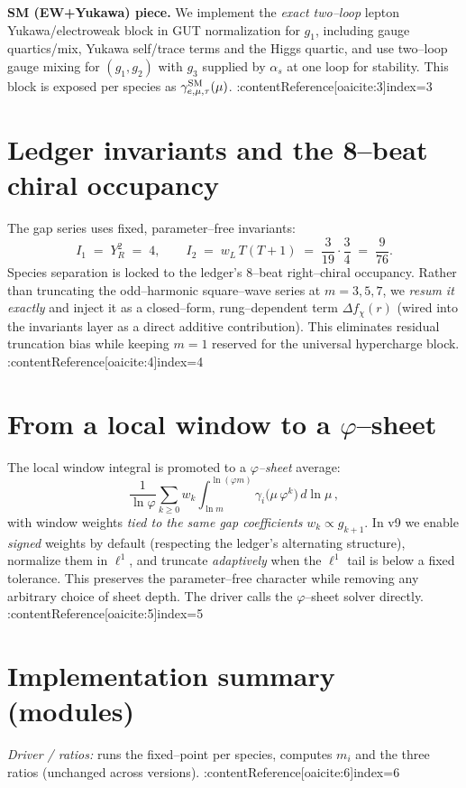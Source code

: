 \documentclass[12pt]{article}
\begin{document}
\textbf{SM (EW+Yukawa) piece.} We implement the \emph{exact two--loop} lepton Yukawa/electroweak block in GUT normalization for $g_1$, including gauge quartics/mix, Yukawa self/trace terms and the Higgs quartic, and use two--loop gauge mixing for $(g_1,g_2)$ with $g_3$ supplied by $\alpha_s$ at one loop for stability. This block is exposed per species as $\gamma^{\rm SM}_{e,\mu,\tau}(\mu)$. :contentReference[oaicite:3]{index=3}

\section*{Ledger invariants and the 8--beat chiral occupancy}
The gap series uses fixed, parameter--free invariants:
\[
I_1 \;=\; Y_R^2 \;=\; 4,\qquad
I_2 \;=\; w_L\,T(T{+}1) \;=\; \frac{3}{19}\cdot\frac{3}{4}\;=\;\frac{9}{76}.
\]
Species separation is locked to the ledger’s $8$--beat right--chiral occupancy. Rather than truncating the odd--harmonic square--wave series at $m=3,5,7$, we \emph{resum it exactly} and inject it as a closed--form, rung--dependent term $\Delta f_\chi(r)$ (wired into the invariants layer as a direct additive contribution). This eliminates residual truncation bias while keeping $m{=}1$ reserved for the universal hypercharge block. :contentReference[oaicite:4]{index=4}

\section*{From a local window to a $\varphi$--sheet}
The local window integral is promoted to a \emph{$\varphi$--sheet} average:
\[
\frac{1}{\ln\varphi}\sum_{k\ge0} w_k \int_{\ln m}^{\ln(\varphi m)} \gamma_i\!\big(\mu\,\varphi^k\big)\,d\ln\mu\,,
\]
with window weights \emph{tied to the same gap coefficients} $w_k\propto g_{k+1}$. In v9 we enable \emph{signed} weights by default (respecting the ledger’s alternating structure), normalize them in $\ell^1$, and truncate \emph{adaptively} when the $\ell^1$ tail is below a fixed tolerance. This preserves the parameter--free character while removing any arbitrary choice of sheet depth. The driver calls the $\varphi$--sheet solver directly. :contentReference[oaicite:5]{index=5}

\section*{Implementation summary (modules)}
\emph{Driver / ratios:} runs the fixed--point per species, computes $m_i$ and the three ratios (unchanged across versions). :contentReference[oaicite:6]{index=6}
\end{document}
